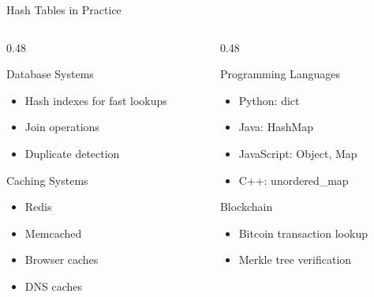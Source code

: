 \documentclass[aspectratio=169,xcolor=dvipsnames]{beamer}
\begin{document}
\begin{frame}{Hash Tables in Practice}
  \begin{columns}
    \begin{column}{0.48\textwidth}
      \begin{block}{Database Systems}
        \begin{itemize}
          \item Hash indexes for fast lookups
          \item Join operations
          \item Duplicate detection
        \end{itemize}
      \end{block}

      \begin{block}{Caching Systems}
        \begin{itemize}
          \item Redis
          \item Memcached
          \item Browser caches
          \item DNS caches
        \end{itemize}
      \end{block}
    \end{column}
    \begin{column}{0.48\textwidth}
      \begin{block}{Programming Languages}
        \begin{itemize}
          \item Python: dict
          \item Java: HashMap
          \item JavaScript: Object, Map
          \item C++: unordered\_map
        \end{itemize}
      \end{block}

      \begin{block}{Blockchain}
        \begin{itemize}
          \item Bitcoin transaction lookup
          \item Merkle tree verification
        \end{itemize}
      \end{block}
    \end{column}
  \end{columns}
\end{frame}
\end{document}
